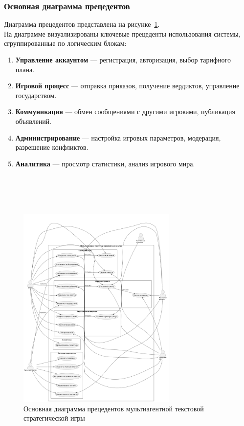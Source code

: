 \subsubsection{Основная диаграмма прецедентов}

Диаграмма прецедентов представлена на рисунке~\ref{fig:main-use-case-diagram}.\\
На диаграмме визуализированы ключевые прецеденты использования системы, сгруппированные по логическим блокам:

\begin{enumerate}
    \item \textbf{Управление аккаунтом} — регистрация, авторизация, выбор тарифного плана.

    \item \textbf{Игровой процесс} — отправка приказов, получение вердиктов, управление государством.

    \item \textbf{Коммуникация} — обмен сообщениями с другими игроками, публикация объявлений.

    \item \textbf{Администрирование} — настройка игровых параметров, модерация, разрешение конфликтов.

    \item \textbf{Аналитика} — просмотр статистики, анализ игрового мира.
~\\~\\~\\~\\~\\
\end{enumerate}
\begin{figure}[h]
    \centering
    \includegraphics[width=0.7\textwidth]{figures/use-case-diagram.png}
    \caption{Основная диаграмма прецедентов мультиагентной текстовой стратегической игры}
    \label{fig:main-use-case-diagram}
\end{figure}\\
~\\~\\~\\~\\~\\
\newpage

